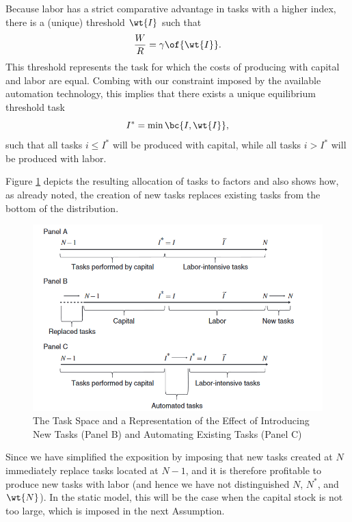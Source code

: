 \documentclass[12pt]{article}
\theoremstyle{definition}
\begin{document}
Because labor has a strict comparative advantage in tasks with a higher index, there is a (unique) threshold $\wt{I}$ such that 
\begin{equation}
    \label{eq: endogenous_task_threshold}
	\frac{W}{R} = \gamma\of{\wt{I}}.
\end{equation}
This threshold represents the task for which the costs of producing with capital and labor are equal. Combing with our constraint imposed by the available automation technology, this implies that there exists a unique equilibrium threshold task $$I^* = \min \bc{I, \wt{I}},$$such that all tasks $i \leq I^*$ will be produced with capital, while all tasks $i > I^*$ will be produced with labor.

Figure \ref{fig: task_space} depicts the resulting allocation of tasks to factors and also shows how, as already noted, the creation of new tasks replaces existing tasks from the bottom of the distribution. 

\begin{figure}[H]
	\noindent\caption{The Task Space and a Representation of the Effect of Introducing New Tasks (Panel B) and Automating Existing Tasks (Panel C)}
	\centerline{\includegraphics[scale=0.9]{acemoglu2018_fig2.png}}
    \label{fig: task_space}
\end{figure}

Since we have simplified the exposition by imposing that new tasks created at $N$ immediately replace tasks located at $N-1$, and it is therefore profitable to produce new tasks with labor (and hence we have not distinguished $N$, $N^*$, and $\wt{N}$). In the static model, this will be the case when the capital stock is not too large, which is imposed in the next Assumption.
\end{document}
